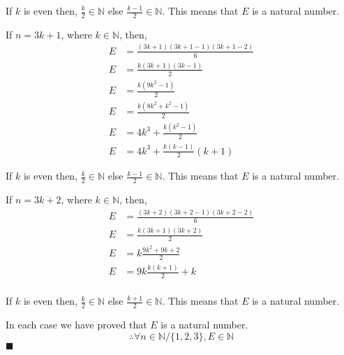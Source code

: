 \documentclass{exam}
\theoremstyle{mytheoremstyle}
\theoremstyle{mytheoremstyle}
\theoremstyle{myproblemstyle}
\begin{document}
\begin{questions}
\begin{solution}
        If \(k\) is even then, \(\displaystyle\frac{k}{2}\in\mathbb{N}\) else \(\displaystyle\frac{k-1}{2}\in\mathbb{N}\). This means that \(E\) is a natural number.

        If \(n=3k+1\), where \(k\in\mathbb{N}\), then,
        \begin{equation}
            \begin{split}
                E&=\frac{(3k+1)(3k+1-1)(3k+1-2)}{6}\\
                E&=\frac{k(3k+1)(3k-1)}{2}\\
                E&=\frac{k(9k^2-1)}{2}\\
                E&=\frac{k(8k^2+k^2-1)}{2}\\
                E&=4k^3+\frac{k(k^2-1)}{2}\\
                E&=4k^3+\frac{k(k-1)}{2}(k+1)
            \end{split}
        \end{equation}

        If \(k\) is even then, \(\displaystyle\frac{k}{2}\in\mathbb{N}\) else \(\displaystyle\frac{k-1}{2}\in\mathbb{N}\). This means that \(E\) is a natural number.

        If \(n=3k+2\), where \(k\in\mathbb{N}\), then,
        \begin{equation}
            \begin{split}
                E&=\frac{(3k+2)(3k+2-1)(3k+2-2)}{6}\\
                E&=\frac{k(3k+1)(3k+2)}{2}\\
                E&=k\frac{9k^2+9k+2}{2}\\
                E&=9k\frac{k(k+1)}{2}+k\\
            \end{split}
        \end{equation}

        If \(k\) is even then, \(\displaystyle\frac{k}{2}\in\mathbb{N}\) else \(\displaystyle\frac{k+1}{2}\in\mathbb{N}\). This means that \(E\) is a natural number.

        In each case we have proved that \(E\) is a natural number.
        \[\therefore \forall n\in\mathbb{N}/\{1,2,3\},E\in\mathbb{N}\]
        \center \(\blacksquare\)
    \end{solution}


\end{questions}
\end{document}
